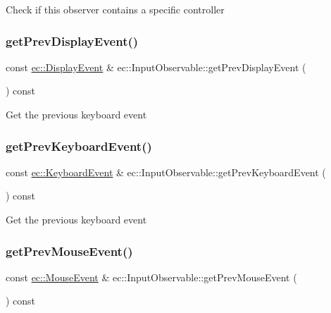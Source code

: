 Check if this observer contains a specific controller \mbox{\label{classec_1_1_input_observable_ac12e711d3a7dcaf65d2028d2283c1243}} 
\subsubsection{\texorpdfstring{get\+Prev\+Display\+Event()}{getPrevDisplayEvent()}}
{\footnotesize\ttfamily const \mbox{\hyperlink{structec_1_1_display_event}{ec\+::\+Display\+Event}} \& ec\+::\+Input\+Observable\+::get\+Prev\+Display\+Event (\begin{DoxyParamCaption}{ }\end{DoxyParamCaption}) const}

Get the previous keyboard event \mbox{\label{classec_1_1_input_observable_ab1ba2fa8deaf1d69a4809e4d8dc61452}} 
\subsubsection{\texorpdfstring{get\+Prev\+Keyboard\+Event()}{getPrevKeyboardEvent()}}
{\footnotesize\ttfamily const \mbox{\hyperlink{structec_1_1_keyboard_event}{ec\+::\+Keyboard\+Event}} \& ec\+::\+Input\+Observable\+::get\+Prev\+Keyboard\+Event (\begin{DoxyParamCaption}{ }\end{DoxyParamCaption}) const}

Get the previous keyboard event \mbox{\label{classec_1_1_input_observable_abf9f1388171a99581a0a4100bbf2d11b}} 
\subsubsection{\texorpdfstring{get\+Prev\+Mouse\+Event()}{getPrevMouseEvent()}}
{\footnotesize\ttfamily const \mbox{\hyperlink{structec_1_1_mouse_event}{ec\+::\+Mouse\+Event}} \& ec\+::\+Input\+Observable\+::get\+Prev\+Mouse\+Event (\begin{DoxyParamCaption}{ }\end{DoxyParamCaption}) const}

